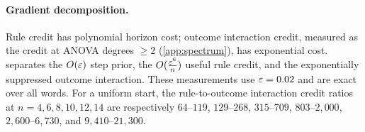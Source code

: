 \begin{table}[H]
\centering\small
{}
\caption{\textbf{Outcome escape grows exponentially while step escape stays nearly constant.} $\initscale=0.002$, zero readout;
ranges are over three draws.}
\label{tab:exit-times}
\end{table}
\paragraph{Gradient decomposition.} Rule credit has polynomial horizon cost; outcome interaction credit, measured as the credit at ANOVA degrees $\ge2$ (\cref{app:spectrum}), has exponential cost.
 separates the $O(\varepsilon)$ step prior, the $O(\frac{\varepsilon^6}{n})$ useful rule credit, and the exponentially
suppressed outcome interaction. These measurements use $\varepsilon=0.02$ and are exact over all words.
For a uniform start, the rule-to-outcome interaction credit ratios at $n=4,6,8,10,12,14$ are respectively
$64$--$119$, $129$--$268$, $315$--$709$, $803$--$2{,}000$, $2{,}600$--$6{,}730$, and $9{,}410$--$21{,}300$.

